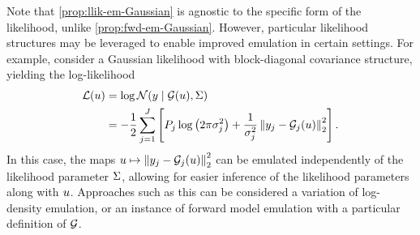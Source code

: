 \documentclass[12pt]{article}
\begin{document}
Note that \cref{prop:llik-em-Gaussian} is agnostic to the specific form of the 
likelihood, unlike \cref{prop:fwd-em-Gaussian}. However, particular likelihood
structures may be leveraged to enable improved emulation in certain settings. For example, 
\citet{FerEmulation} consider a Gaussian likelihood with block-diagonal covariance structure, yielding
the log-likelihood
\begin{align}
\mathcal{L}(u) 
&= \log \mathcal{N}(y \mid \mathcal{G}(u), \Sigma) \nonumber \\
&= - \frac{1}{2} \sum_{j=1}^{J} \left[P_j \log\left(2\pi\sigma_j^2\right) +
 \frac{1}{\sigma_j^2} \left\lVert y_j - \mathcal{G}_j(u)\right\rVert_2^2 \right].
\end{align}
In this case, the maps $u \mapsto \left\lVert y_j - \mathcal{G}_j(u)\right\rVert_2^2$ can be emulated 
independently of the likelihood parameter $\Sigma$, allowing for easier inference of the 
likelihood parameters along with $u$.
Approaches such as this can be considered a variation of log-density emulation, or an instance of 
forward model emulation with a particular definition of $\mathcal{G}$.
 
\end{document}

